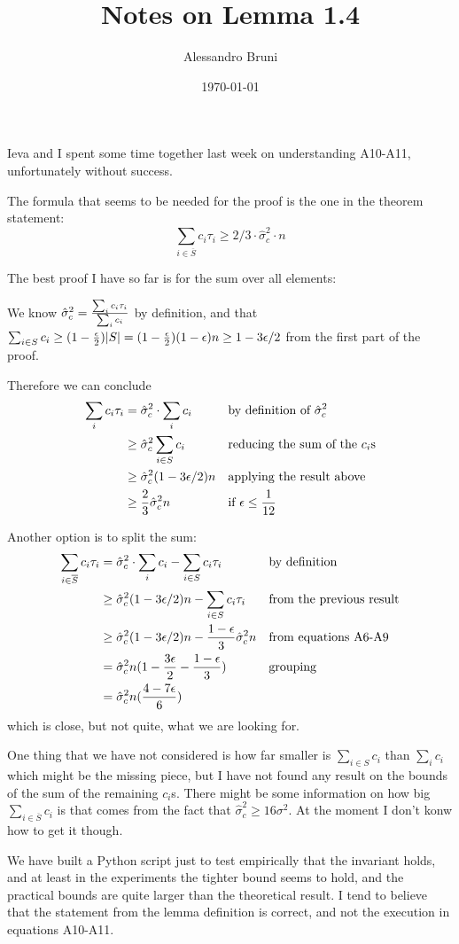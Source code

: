 \documentclass[11pt]{article}
\author{Alessandro Bruni}
\date{\today}
\title{Notes on Lemma 1.4}
\begin{document}
\maketitle
Ieva and I spent some time together last week on understanding A10-A11, unfortunately without success.

The formula that seems to be needed for the proof is the one in the theorem statement:
\[ \sum_{i \in \overline S} c_i \tau_i \ge 2/3 \cdot \hat\sigma_c^2 \cdot n \]

The best proof I have so far is for the sum over all elements:

We know \(\hat\sigma_c^2 = {\sum_i c_i \tau_i \over \sum_i c_i}\) by definition, and that  \(\sum_{i \in S} c_i \ge (1-{\epsilon\over 2})|S| = (1-{\epsilon\over 2})(1-\epsilon)n \ge 1-3\epsilon/2\) from the first part of the proof.

Therefore we can conclude
\begin{align*}
\sum_i c_i \tau_i &= \hat\sigma_c^2 \cdot \sum_i c_i &&\text{by definition of }\hat\sigma_c^2\\
&\ge \hat\sigma_c^2 \sum_{i \in S} c_i &&\text{reducing the sum of the $c_i$s}\\
&\ge \hat\sigma_c^2 (1-3\epsilon/2)n &&\text{applying the result above}\\
&\ge {2\over 3} \hat\sigma_c^2 n &&\text{if }\epsilon \le {1\over12}
\end{align*}

Another option is to split the sum:
\begin{align*}
\sum_{i \in \overline S} c_i \tau_i &= \hat\sigma_c^2 \cdot \sum_i c_i - \sum_{i \in S} c_i \tau_i &&\text{by definition}\\
&\ge \hat\sigma_c^2(1-3\epsilon/2)n - \sum_{i\in S}c_i \tau_i&&\text{from the previous result}\\
&\ge \hat\sigma_c^2(1-3\epsilon/2)n - {1-\epsilon \over 3}\hat\sigma_c^2n &&\text{from equations A6-A9}\\
&= \hat\sigma_c^2n(1-{3\epsilon\over 2} - {1-\epsilon \over 3}) &&\text{grouping}\\
&= \hat\sigma_c^2n({4-7\epsilon \over 6})
\end{align*}
which is close, but not quite, what we are looking for.

One thing that we have not considered is how far smaller is \(\sum_{i\in S} c_i\) than \(\sum_i c_i\) which might be the missing piece, but I have not found any result on the bounds of the sum of the remaining \(c_i\)s.
There might be some information on how big \(\sum_{i \in \overline S} c_i\) is that comes from the fact that \(\hat\sigma_c^2 \ge 16 \sigma^2\).
At the moment I don't konw how to get it though.

We have built a Python script just to test empirically that the invariant holds, and at least in the experiments the tighter bound seems to hold, and the practical bounds are quite larger than the theoretical result. I tend to believe that the statement from the lemma definition is correct, and not the execution in equations A10-A11.
\end{document}
